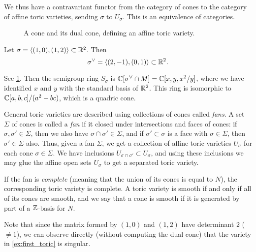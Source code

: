 We thus have a contravariant functor from the category of cones to the category of affine toric varieties, sending $\sigma$ to $U_\sigma$. This is an equivalence of categories.

\begin{example}
\label{ex:first_toric}
\begin{figure}
\centering 
\hspace*{\fill}%
\subbottom[The cone $\sigma = \langle (1,0), (1,2) \rangle$.]{

\label{fig:toric_example}
}
 \hspace*{\fill}%
 \hspace*{\fill}%
\caption{A cone and its dual cone, defining an affine toric variety.}
\label{fig:first_toric_example}
\end{figure}

Let $\sigma=\langle (1,0), (1,2) \rangle \subset \mathbb{R}^2$. Then
\[
\sigma^\vee = \langle (2,-1),(0,1) \rangle \subset \mathbb{R}^2.
\]

See \cref{fig:first_toric_example}. Then the semigroup ring $S_\sigma$ is $\mathbb{C}[\sigma^\vee \cap M] = \mathbb{C}[x,y,x^2/y]$, where we have identified $x$ and $y$ with the standard basis of $\mathbb{R}^2$. This ring is isomorphic to $\mathbb{C}[a,b,c]/(a^2-bc)$, which is a quadric cone.
\end{example}

General toric varieties are described using collections of cones called \emph{fans}. A set $\Sigma$ of cones is called a \emph{fan} if it closed under intersections and faces of cones: if $\sigma, \sigma' \in \Sigma$, then we also have $\sigma \cap \sigma' \in \Sigma$, and if $\sigma' \subset \sigma$ is a face with $\sigma \in \Sigma$, then $\sigma' \in \Sigma$ also. Thus, given a fan $\Sigma$, we get a collection of affine toric varieties $U_\sigma$ for each cone $\sigma \in \Sigma$. We have inclusions $U_{\sigma \cap \sigma'} \subset U_\sigma$, and using these inclusions we may glue the affine open sets $U_\sigma$ to get a separated toric variety.

If the fan is \emph{complete} (meaning that the union of its cones is equal to $N$), the corresponding toric variety is complete. A toric variety is smooth if and only if all of its cones are smooth, and we say that a cone is smooth if it is generated by part of a $\mathbb{Z}$-basis for $N$.

\begin{remark}
Note that since the matrix formed by $(1,0)$ and $(1,2)$ have determinant $2$ ($\neq 1$), we can observe directly (without computing the dual cone) that the variety in \cref{ex:first_toric} is singular.
\end{remark}

